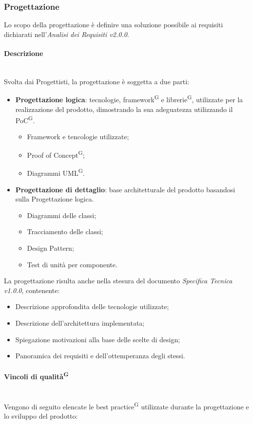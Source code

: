 \documentclass[8pt]{article}
\newcommand{\glossterm}[1]{#1\textsuperscript{G}} %
\newcommand{\subsubsubsection}[1]{\paragraph{#1}\mbox{}\\}
\begin{document}
\subsubsection{Progettazione} \label{sec:progettazione}
Lo scopo della progettazione è definire una soluzione possibile ai requisiti dichiarati nell'\textit{Analisi dei Requisiti v2.0.0}.
\subsubsubsection{Descrizione}
Svolta dai Progettisti, la progettazione è soggetta a due parti:
\begin{itemize}
    \item{\textbf{Progettazione logica}:} tecnologie, \glossterm{framework} e \glossterm{librerie}, utilizzate per la realizzazione del prodotto, dimostrando la sua adeguatezza utilizzando il \glossterm{PoC}.
    \begin{itemize}
        \item Framework e tencologie utilizzate;
        \item \glossterm{Proof of Concept};
        \item Diagrammi \glossterm{UML}.
    \end{itemize}
    \item{\textbf{Progettazione di dettaglio}:} base architetturale del prodotto basandosi sulla Progettazione logica.
    \begin{itemize}
        \item Diagrammi delle classi;
        \item Tracciamento delle classi;
        \item Design Pattern;
        \item Test di unità per componente.
    \end{itemize}
\end{itemize}
La progettazione risulta anche nella stesura del documento \textit{Specifica Tecnica v1.0.0}, contenente:
\begin{itemize}
    \item Descrizione approfondita delle tecnologie utilizzate;
    \item Descrizione dell'architettura implementata;
    \item Spiegazione motivazioni alla base delle scelte di design;
    \item Panoramica dei requisiti e dell'ottemperanza degli stessi.
\end{itemize}
\subsubsubsection{Vincoli di \glossterm{qualità}}
Vengono di seguito elencate le \glossterm{best practice} utilizzate durante la progettazione e lo sviluppo del prodotto:
\end{document}

